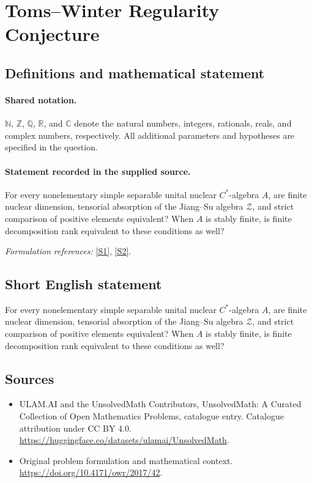 \documentclass[11pt]{article}
\newcommand{\sref}[2]{\hyperlink{source:#1:#2}{[S#2]}}
\begin{document}
\section{Toms–Winter Regularity Conjecture}\label{statement}

\subsection{Definitions and mathematical statement}

\paragraph{Shared notation.}$\mathbb N$, $\mathbb Z$, $\mathbb Q$, $\mathbb R$, and $\mathbb C$ denote the natural numbers, integers, rationals, reals, and complex numbers, respectively. All additional parameters and hypotheses are specified in the question.


\paragraph{Statement recorded in the supplied source.}
For every nonelementary simple separable unital nuclear $C^*$-algebra $A$, are finite nuclear dimension, tensorial absorption of the Jiang–Su algebra $\mathcal Z$, and strict comparison of positive elements equivalent? When $A$ is stably finite, is finite decomposition rank equivalent to these conditions as well?
\par\smallskip\textit{Formulation references:} \sref{statement}{1}, \sref{statement}{2}.
\subsection{Short English statement}
For every nonelementary simple separable unital nuclear $C^*$-algebra $A$, are finite nuclear dimension, tensorial absorption of the Jiang–Su algebra $\mathcal Z$, and strict comparison of positive elements equivalent? When $A$ is stably finite, is finite decomposition rank equivalent to these conditions as well?
\subsection{Sources}
\begin{itemize}
\item[\hypertarget{source:statement:1}{S1}] ULAM.AI and the UnsolvedMath Contributors, UnsolvedMath: A Curated Collection of Open Mathematics Problems, catalogue entry. Catalogue attribution under CC BY 4.0.
\url{https://huggingface.co/datasets/ulamai/UnsolvedMath}.
\item[\hypertarget{source:statement:2}{S2}] Original problem formulation and mathematical context.
\url{https://doi.org/10.4171/owr/2017/42}.
\end{itemize}
\label{end:statement}
\end{document}

